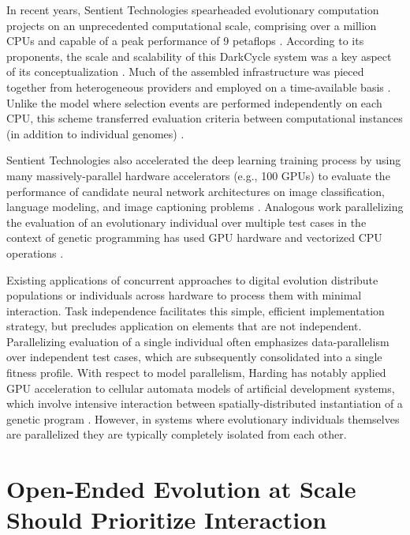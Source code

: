 In recent years, Sentient Technologies spearheaded evolutionary computation projects on an unprecedented computational scale, comprising over a million CPUs and capable of a peak performance of 9 petaflops \citep{miikkulainen2019evolving}.
According to its proponents, the scale and scalability of this DarkCycle system was a key aspect of its conceptualization \citep{gilbert2015artificial}.
Much of the assembled infrastructure was pieced together from heterogeneous providers and employed on a time-available basis \citep{blondeau2009distributed}.
Unlike the model where selection events are performed independently on each CPU, this scheme transferred evaluation criteria between computational instances (in addition to individual genomes) \citep{hodjat2013distributed}.

Sentient Technologies also accelerated the deep learning training process by using many massively-parallel hardware accelerators (e.g., 100 GPUs) to evaluate the performance of candidate neural network architectures on image classification, language modeling, and image captioning problems \citep{miikkulainen2019evolving}.
Analogous work parallelizing the evaluation of an evolutionary individual over multiple test cases in the context of genetic programming has used GPU hardware and vectorized CPU operations
\citep{harding2007fast_springer, langdon2019continuous}.

Existing applications of concurrent approaches to digital evolution distribute populations or individuals across hardware to process them with minimal interaction.
Task independence facilitates this simple, efficient implementation strategy, but precludes application on elements that are not independent.
Parallelizing evaluation of a single individual often emphasizes data-parallelism over independent test cases, which are subsequently consolidated into a single fitness profile.
With respect to model parallelism, Harding has notably applied GPU acceleration to cellular automata models of artificial development systems, which involve intensive interaction between spatially-distributed instantiation of a genetic program \citep{harding2007fast_ieee}.
However, in systems where evolutionary individuals themselves are parallelized they are typically completely isolated from each other.

\section{Open-Ended Evolution at Scale Should Prioritize Interaction}

